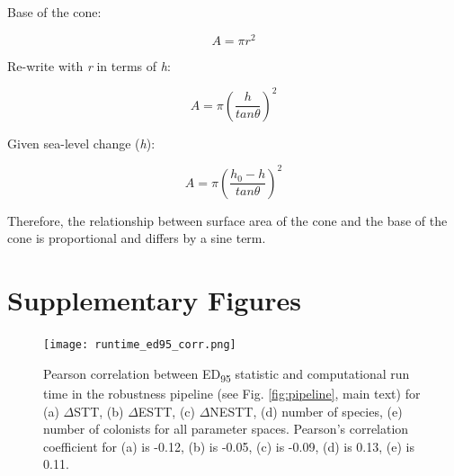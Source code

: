 Base of the cone: 

\[ A = \pi r^2 \]

Re-write with \textit{r} in terms of \textit{h}:

\[ A = \pi \left( \frac{h}{tan \theta} \right)^2 \]

Given sea-level change (\textit{h}): 

\[ A = \pi \left( \frac{h_0 - h}{tan \theta} \right) ^2 \]

Therefore, the relationship between surface area of the cone and the base of the cone is proportional and differs by a sine term.

\clearpage

\section*{Supplementary Figures}

\begin{figure}[ht]
    \centering
    \texttt{[image: runtime\_ed95\_corr.png]}
    \caption{Pearson correlation between ED\textsubscript{95} statistic and computational run time in the robustness pipeline (see Fig. \ref{fig:pipeline}, main text) for (a) $\Delta$STT, (b) $\Delta$ESTT, (c) $\Delta$NESTT, (d) number of species, (e) number of colonists for all parameter spaces. Pearson’s correlation coefficient for (a) is -0.12, (b) is -0.05, (c) is -0.09, (d) is 0.13, (e) is 0.11.}
    \label{fig:runtime_ed95_corr}
\end{figure}

